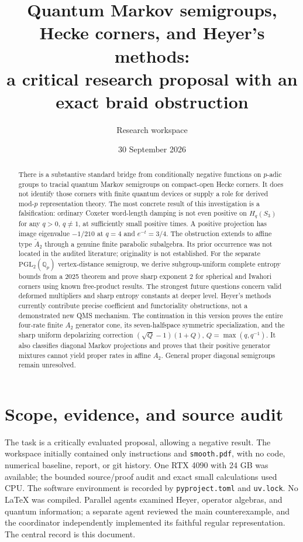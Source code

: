 \documentclass[11pt]{article}
\title{Quantum Markov semigroups, Hecke corners, and Heyer's methods:\\a critical research proposal with an exact braid obstruction}
\author{Research workspace}
\date{30 September 2026}
\theoremstyle{remark}\newtheorem{remark}[definition]{Remark}
\newcommand{\Q}{\mathbb{Q}}
\begin{document}
\maketitle
\begin{abstract}
There is a substantive standard bridge from conditionally negative functions on
$p$-adic groups to tracial quantum Markov semigroups on compact-open Hecke
corners. It does not identify those corners with finite quantum devices or
supply a role for derived mod-$p$ representation theory. The most concrete
result of this investigation is a falsification: ordinary Coxeter word-length
damping is not even positive on $H_q(S_3)$ for any $q>0$, $q\ne1$, at sufficiently
small positive times. A positive projection has image eigenvalue $-1/210$ at
$q=4$ and $e^{-t}=3/4$. The obstruction extends to affine type $\widetilde A_2$
through a genuine finite parabolic subalgebra. Its prior occurrence was not
located in the audited literature; originality is not established.
For the separate $\mathrm{PGL}_2(\Q_p)$ vertex-distance semigroup, we derive
subgroup-uniform complete entropy bounds from a 2025 theorem and prove sharp
exponent $2$ for spherical and Iwahori corners using known free-product results.
The strongest future questions concern valid deformed multipliers and sharp
entropy constants at deeper level. Heyer's methods currently contribute precise
coefficient and functoriality obstructions, not a demonstrated new QMS mechanism.
The continuation in this version proves the entire four-rate finite $A_2$
generator cone, its seven-halfspace symmetric specialization, and the sharp
uniform depolarizing correction $(\sqrt Q-1)(1+Q)$, $Q=\max(q,q^{-1})$.
It also classifies diagonal Markov projections and proves that their positive
generator mixtures cannot yield proper rates in affine $A_2$. General proper
diagonal semigroups remain unresolved.
\end{abstract}

\section{Scope, evidence, and source audit}
The task is a critically evaluated proposal, allowing a negative result. The
workspace initially contained only instructions and \texttt{smooth.pdf}, with
no code, numerical baseline, report, or git history. One RTX 4090 with 24 GB was
available; the bounded source/proof audit and exact small calculations used CPU.
The software environment is recorded by \texttt{pyproject.toml} and
\texttt{uv.lock}. No LaTeX was compiled. Parallel agents examined Heyer,
operator algebras, and quantum information; a separate agent reviewed the main
counterexample, and the coordinator independently implemented its faithful
regular representation. The central record is this document.
\end{document}
